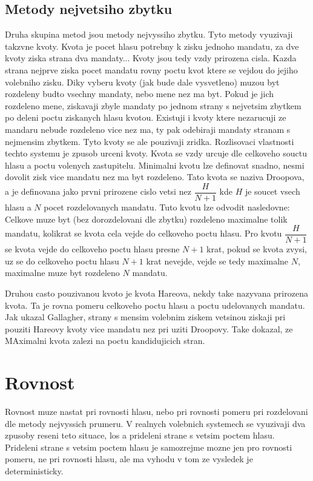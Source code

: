 \documentclass[12pt,a4paper]{scrreprt}
\begin{document}
\subsection{Metody nejvetsiho zbytku}
Druha skupina metod jsou metody nejvyssiho zbytku.
Tyto metody vyuzivaji takzvne kvoty.
Kvota je pocet hlasu potrebny k zisku jednoho mandatu, za dve kvoty ziska strana dva mandaty...
Kvoty jsou tedy vzdy prirozena cisla.
Kazda strana nejprve ziska pocet mandatu rovny poctu kvot ktere se vejdou do jejiho volebniho zisku.
Diky vyberu kvoty (jak bude dale vysvetleno) muzou byt rozdeleny budto vsechny mandaty, nebo mene nez ma byt.
Pokud je jich rozdeleno mene, ziskavaji zbyle mandaty po jednom strany s nejvetsim zbytkem po deleni poctu ziskanych hlasu kvotou.
Existuji i kvoty ktere nezarucuji ze mandaru nebude rozdeleno vice nez ma, ty pak odebiraji mandaty stranam s nejmensim zbytkem.
Tyto kvoty se ale pouzivaji zridka.
Rozlisovaci vlastnosti techto systemu je zpusob urceni kvoty.
Kvota se vzdy urcuje dle celkoveho souctu hlasu a poctu volenych zastupitelu.
Minimalni kvotu lze definovat snadno, nesmi dovolit zisk vice mandatu nez ma byt rozdeleno.
Tato kvota se naziva Droopova, a je definovana jako prvni prirozene cislo vetsi nez $\dfrac{H}{N+1}$ kde $H$ je soucet vsech hlasu a $N$ pocet rozdelovanych mandatu.
Tuto kvotu lze odvodit nasledovne: Celkove muze byt (bez dorozdelovani dle zbytku) rozdeleno maximalne tolik mandatu, kolikrat se kvota cela vejde do celkoveho poctu hlasu.
Pro kvotu $\dfrac{H}{N+1}$ se kvota vejde do celkoveho poctu hlasu presne $N+1$ krat, pokud se kvota zvysi, uz se do celkoveho poctu hlasu $N+1$ krat nevejde, vejde se tedy maximalne $N$, maximalne muze byt rozdeleno $N$ mandatu.

Druhou casto pouzivanou kvoto je kvota Hareova, nekdy take nazyvana prirozena kvota. Ta je rovna pomeru celkoveho poctu hlasu a poctu udelovanych mandatu.
Jak ukazal Gallagher, strany s mensim volebnim ziskem vetsinou ziskaji pri pouziti Hareovy kvoty vice mandatu nez pri uziti Droopovy. Take dokazal, ze MAximalni kvota zalezi na poctu kandidujicich stran.\autocite{GAL1}

\section{Rovnost}
Rovnost muze nastat pri rovnosti hlasu, nebo pri rovnosti pomeru pri rozdelovani dle metody nejvyssich prumeru.
V realnych volebnich systemech se vyuzivaji dva zpusoby reseni teto situace, los a prideleni strane s vetsim poctem hlasu. 
Prideleni strane s vetsim poctem hlasu je samozrejme mozne jen pro rovnosti pomeru, ne pri rovnosti hlasu, ale ma vyhodu v tom ze vysledek je deterministicky.
\end{document}
